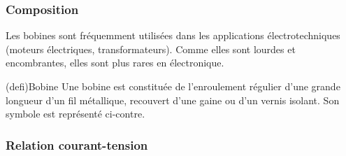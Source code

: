 \documentclass[../../main/main.tex]{subfiles}
\begin{document}
\subsubsection{Composition}

Les bobines sont fréquemment utilisées dans les applications électrotechniques
(moteurs électriques, transformateurs). Comme elles sont lourdes et
encombrantes, elles sont plus rares en électronique.

\begin{tcb*}[label=def:bobine, sidebyside, righthand ratio=.3](defi){Bobine}
	Une bobine est constituée de l'enroulement régulier d'une grande
	longueur d'un fil métallique, recouvert d'une gaine ou d'un vernis
	isolant. Son symbole est représenté ci-contre.
	\tcblower
	\begin{center}
	\end{center}
\end{tcb*}

\vspace{-15pt}
\subsubsection{Relation courant-tension}
\end{document}
